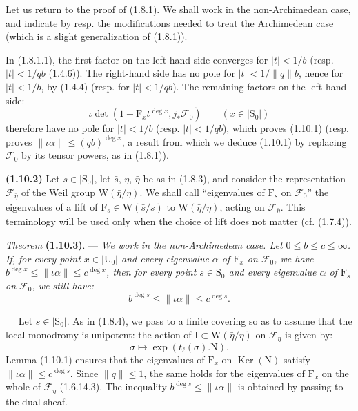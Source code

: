 \documentclass[11pt,leqno]{article}
\newcommand{\Page}[1]{\ifvmode\noindent\else\unskip\ \fi{\footnotesize\textcolor{gray}{[p.\,#1]}}\ \ignorespaces}
\begin{document}
Let us return to the proof of (1.8.1). We shall work in the non-Archimedean case, and indicate by resp. the modifications needed to treat the Archimedean case (which is a slight generalization of (1.8.1)).

In (1.8.1.1), the first factor on the left-hand side converges for \(\lvert t\rvert<1/b\) (resp. \(\lvert t\rvert<1/qb\) (1.4.6)). The right-hand side has no pole for \(\lvert t\rvert<1/\lVert q\rVert b\), hence for \(\lvert t\rvert<1/b\), by (1.4.4) (resp. for \(\lvert t\rvert<1/qb\)). The remaining factors on the left-hand side:
\[
\iota\det(1-\mathrm{F}_xt^{\deg x},j_*\mathscr{F}_0)
\qquad (x\in\lvert\mathrm{S}_0\rvert)
\]
therefore have no pole for \(\lvert t\rvert<1/b\) (resp. \(\lvert t\rvert<1/qb\)), which proves (1.10.1) (resp. proves \(\lVert\iota\alpha\rVert\leq(qb)^{\deg x}\), a result from which we deduce (1.10.1) by replacing \(\mathscr{F}_0\) by its tensor powers, as in (1.8.1)).

\textbf{(1.10.2)} Let \(s\in\lvert\mathrm{S}_0\rvert\), let \(\bar{s}\), \(\eta\), \(\bar{\eta}\) be as in (1.8.3), and consider the representation \(\mathscr{F}_{\bar{\eta}}\) of the Weil group \(\mathrm{W}(\bar{\eta}/\eta)\). We shall call “eigenvalues of \(\mathrm{F}_s\) on \(\mathscr{F}_0\)” the eigenvalues of a lift of \(\mathrm{F}_s\in\mathrm{W}(\bar{s}/s)\) to \(\mathrm{W}(\bar{\eta}/\eta)\), acting on \(\mathscr{F}_{\bar{\eta}}\). This terminology will be used only when the choice of lift does not matter (cf. (1.7.4)).

\textit{Theorem} \textbf{(1.10.3)}. — \textit{We work in the non-Archimedean case. Let \(0\leq b\leq c\leq\infty\). If, for every point \(x\in\lvert\mathrm{U}_0\rvert\) and every eigenvalue \(\alpha\) of \(\mathrm{F}_x\) on \(\mathscr{F}_0\), we have \(b^{\deg x}\leq\lVert\iota\alpha\rVert\leq c^{\deg x}\), then for every point \(s\in\mathrm{S}_0\) and every eigenvalue \(\alpha\) of \(\mathrm{F}_s\) on \(\mathscr{F}_0\), we still have:}
\[
b^{\deg s}\leq\lVert\iota\alpha\rVert\leq c^{\deg s}.
\]

\Page{183}
Let \(s\in\lvert\mathrm{S}_0\rvert\). As in (1.8.4), we pass to a finite covering so as to assume that the local monodromy is unipotent: the action of \(\mathrm{I}\subset\mathrm{W}(\bar{\eta}/\eta)\) on \(\mathscr{F}_{\bar{\eta}}\) is given by:
\[
\sigma\mapsto\exp(t_\ell(\sigma).\mathrm{N}).
\]
Lemma (1.10.1) ensures that the eigenvalues of \(\mathrm{F}_x\) on \(\operatorname{Ker}(\mathrm{N})\) satisfy \(\lVert\iota\alpha\rVert\leq c^{\deg s}\). Since \(\lVert q\rVert\leq1\), the same holds for the eigenvalues of \(\mathrm{F}_x\) on the whole of \(\mathscr{F}_{\bar{\eta}}\) (1.6.14.3). The inequality \(b^{\deg s}\leq\lVert\iota\alpha\rVert\) is obtained by passing to the dual sheaf.
\end{document}
